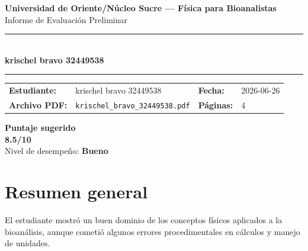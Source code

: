 \documentclass[11pt,a4paper]{article}
\begin{document}
\begin{center}
  {\Large\bfseries\color{azulTitulo} Universidad de Oriente/Núcleo Sucre --- Física para Bioanalistas}\\[4pt]
  {\large Informe de Evaluación Preliminar}\\[12pt]
  \rule{\linewidth}{1.2pt}\\[6pt]
  {\LARGE\bfseries krischel bravo 32449538}\\[4pt]
  \rule{\linewidth}{0.6pt}
\end{center}

\vspace{4pt}
\begin{tcolorbox}[cajaTitulo, title=Datos del informe]
\begin{tabular}{@{}llll@{}}
  \textbf{Estudiante:}  & krischel bravo 32449538  &
  \textbf{Fecha:}       & 2026-06-26 \\[4pt]
  \textbf{Archivo PDF:} & \texttt{krischel\_bravo\_32449538.pdf}  &
  \textbf{Páginas:}     & 4 \\
\end{tabular}
\end{tcolorbox}

\vspace{6pt}
\begin{center}
  \begin{tcolorbox}[
    enhanced,
    colback=white, colframe=desempeno_bueno,
    width=0.62\linewidth,
    boxrule=2pt,
    halign=center, valign=center,
    top=8pt, bottom=8pt,
  ]
    \centering
    {\large\bfseries Puntaje sugerido}\\[6pt]
    {\Huge\bfseries\color{desempeno_bueno} 8.5/10}\\[6pt]
    {\large Nivel de desempeño: \textbf{\color{desempeno_bueno} Bueno}}
  \end{tcolorbox}
\end{center}

\section*{Resumen general}
El estudiante mostró un buen dominio de los conceptos físicos aplicados a la bioanálisis, aunque cometió algunos errores procedimentales en cálculos y manejo de unidades.
\end{document}
